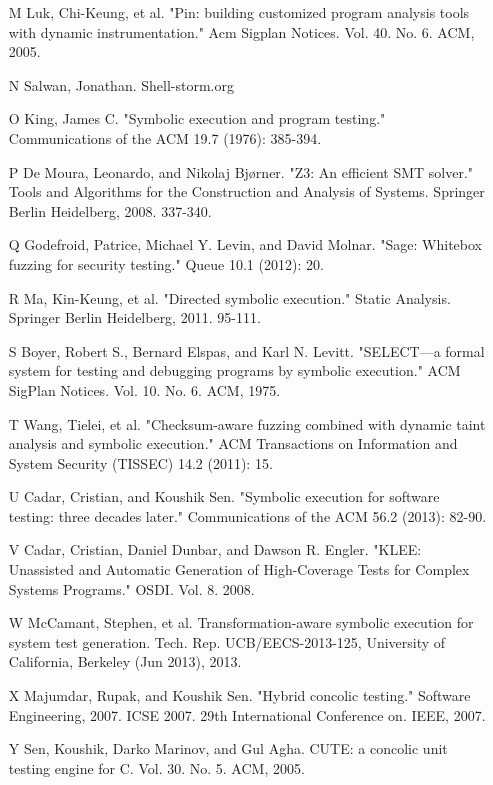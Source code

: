 \documentclass[10pt, twocolumn, times, nocopyrightspace, preprint]{sigplanconf}
\begin{document}
\begin{itemize}
	\item [M] Luk, Chi-Keung, et al. "Pin: building customized program analysis tools with dynamic instrumentation." Acm Sigplan Notices. Vol. 40. No. 6. ACM, 2005.
	\item [N] Salwan, Jonathan. Shell-storm.org %
	\item [O] King, James C. "Symbolic execution and program testing." Communications of the ACM 19.7 (1976): 385-394.
	\item [P] De Moura, Leonardo, and Nikolaj Bjørner. "Z3: An efficient SMT solver." Tools and Algorithms for the Construction and Analysis of Systems. Springer Berlin Heidelberg, 2008. 337-340.
	\item [Q] Godefroid, Patrice, Michael Y. Levin, and David Molnar. "Sage: Whitebox fuzzing for security testing." Queue 10.1 (2012): 20.
	\item [R] Ma, Kin-Keung, et al. "Directed symbolic execution." Static Analysis. Springer Berlin Heidelberg, 2011. 95-111.
	\item [S] Boyer, Robert S., Bernard Elspas, and Karl N. Levitt. "SELECT—a formal system for testing and debugging programs by symbolic execution." ACM SigPlan Notices. Vol. 10. No. 6. ACM, 1975.
	\item [T] Wang, Tielei, et al. "Checksum-aware fuzzing combined with dynamic taint analysis and symbolic execution." ACM Transactions on Information and System Security (TISSEC) 14.2 (2011): 15.
	\item [U] Cadar, Cristian, and Koushik Sen. "Symbolic execution for software testing: three decades later." Communications of the ACM 56.2 (2013): 82-90.
	\item [V] Cadar, Cristian, Daniel Dunbar, and Dawson R. Engler. "KLEE: Unassisted and Automatic Generation of High-Coverage Tests for Complex Systems Programs." OSDI. Vol. 8. 2008.
	\item [W] McCamant, Stephen, et al. Transformation-aware symbolic execution for system test generation. Tech. Rep. UCB/EECS-2013-125, University of California, Berkeley (Jun 2013), 2013.
	\item [X] Majumdar, Rupak, and Koushik Sen. "Hybrid concolic testing." Software Engineering, 2007. ICSE 2007. 29th International Conference on. IEEE, 2007.
	\item [Y] Sen, Koushik, Darko Marinov, and Gul Agha. CUTE: a concolic unit testing engine for C. Vol. 30. No. 5. ACM, 2005.

\end{itemize}
\end{document}
